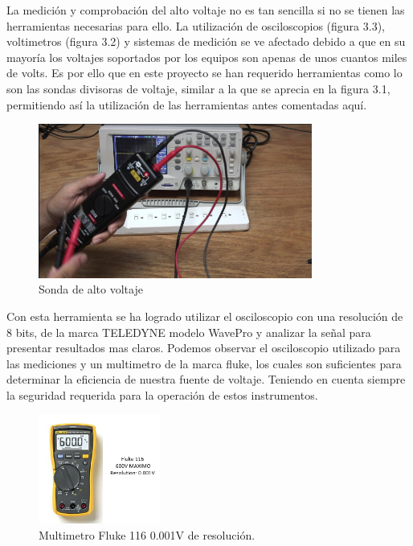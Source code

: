 La medición y comprobación del alto voltaje no es tan sencilla si no se tienen las herramientas necesarias para ello. La utilización de osciloscopios (figura 3.3), voltimetros (figura 3.2) y sistemas de medición se ve afectado debido a que en su mayoría los voltajes soportados por los equipos son apenas de unos cuantos miles de volts. Es por ello que en este proyecto se han requerido herramientas como lo son las sondas divisoras de voltaje, similar a la que se aprecia en la figura 3.1, permitiendo así la utilización de las herramientas antes comentadas aquí.\\

\begin{figure}[H]
\centering
\includegraphics[width=9cm]{Capitulo3/figs/sonda.png}
\caption{Sonda de alto voltaje}
\end{figure}

Con esta herramienta se ha logrado utilizar el osciloscopio con una resolución de 8 bits, de la marca TELEDYNE modelo WavePro y analizar la señal para presentar resultados mas claros. Podemos observar el osciloscopio utilizado para las mediciones y un multimetro de la marca fluke, los cuales son suficientes para determinar la eficiencia de nuestra fuente de voltaje. Teniendo en cuenta siempre la seguridad requerida para la operación de estos instrumentos.


\begin{figure}[H]
\centering
\includegraphics[width=4cm]{Capitulo3/figs/multim.png}
\caption{Multimetro Fluke 116 0.001V de resolución.}
\end{figure}

